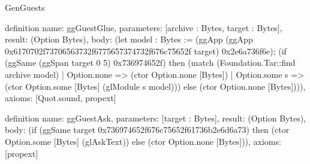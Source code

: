 \begin{lexlean}{GenGuests}
\begin{semanticmodule}
definition{
  name: ggGuestGlue,
  parameters: [archive : Bytes, target : Bytes],
  result: (Option Bytes),
  body: (let model : Bytes := (ggApp (ggApp 0x6170702f73706563732f6775657374732f676c75652f target) 0x2e6a736f6e); (if (ggSame (ggSpan target 0 5) 0x736974652f) then (match (Foundation.Tar::find archive model)
    | Option.none => (ctor Option.none [Bytes])
    | Option.some s => (ctor Option.some [Bytes] (glModule s model))) else (ctor Option.none [Bytes]))),
  axioms: [Quot.sound, propext]
}

definition{
  name: ggGuestAsk,
  parameters: [target : Bytes],
  result: (Option Bytes),
  body: (if (ggSame target 0x736974652f676c75652f61736b2e6d6a73) then (ctor Option.some [Bytes] (glAskText)) else (ctor Option.none [Bytes])),
  axioms: [propext]
}
\end{semanticmodule}
\end{lexlean}
